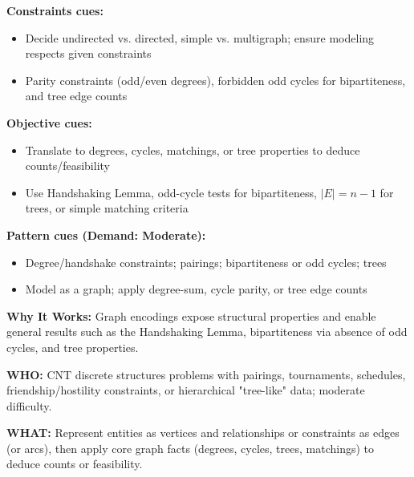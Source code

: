 \documentclass[12pt]{article}
\begin{document}
\textbf{Constraints cues:}
\begin{itemize}
    \item Decide undirected vs. directed, simple vs. multigraph; ensure modeling respects given constraints
    \item Parity constraints (odd/even degrees), forbidden odd cycles for bipartiteness, and tree edge counts
\end{itemize}

\textbf{Objective cues:}
\begin{itemize}
    \item Translate to degrees, cycles, matchings, or tree properties to deduce counts/feasibility
    \item Use Handshaking Lemma, odd-cycle tests for bipartiteness, $|E|=n-1$ for trees, or simple matching criteria
\end{itemize}

\textbf{Pattern cues (Demand: Moderate):}
\begin{itemize}
    \item Degree/handshake constraints; pairings; bipartiteness or odd cycles; trees
    \item Model as a graph; apply degree-sum, cycle parity, or tree edge counts
\end{itemize}

\textbf{Why It Works:} Graph encodings expose structural properties and enable general results such as the Handshaking Lemma, bipartiteness via absence of odd cycles, and tree properties.

\textbf{WHO:} CNT discrete structures problems with pairings, tournaments, schedules, friendship/hostility constraints, or hierarchical "tree-like" data; moderate difficulty.

\textbf{WHAT:} Represent entities as vertices and relationships or constraints as edges (or arcs), then apply core graph facts (degrees, cycles, trees, matchings) to deduce counts or feasibility.
\end{document}
